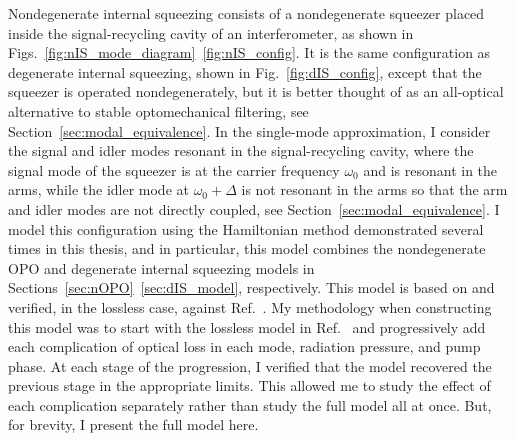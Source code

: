 Nondegenerate internal squeezing consists of a nondegenerate squeezer placed inside the signal-recycling cavity of an interferometer, as shown in Figs.~\ref{fig:nIS_mode_diagram}~\ref{fig:nIS_config}. It is the same configuration as degenerate internal squeezing, shown in Fig.~\ref{fig:dIS_config}, except that the squeezer is operated nondegenerately, but it is better thought of as an all-optical alternative to stable optomechanical filtering, see Section~\ref{sec:modal_equivalence}. In the single-mode approximation, I consider the signal and idler modes resonant in the signal-recycling cavity, where the signal mode of the squeezer is at the carrier frequency $\omega_0$ and is resonant in the arms, while the idler mode at $\omega_0+\Delta$ is not resonant in the arms so that the arm and idler modes are not directly coupled, see Section~\ref{sec:modal_equivalence}. 
I model this configuration using the Hamiltonian method demonstrated several times in this thesis, and in particular, this model combines the nondegenerate OPO and degenerate internal squeezing models in Sections~\ref{sec:nOPO}~\ref{sec:dIS_model}, respectively. %
This model is based on and verified, in the lossless case, against Ref.~\cite{Li2020}. 
My methodology when constructing this model was to start with the lossless model in Ref.~\cite{Li2020} and progressively add each complication of optical loss in each mode, radiation pressure, and pump phase. At each stage of the progression, I verified that the model recovered the previous stage in the appropriate limits. This allowed me to study the effect of each complication separately rather than study the full model all at once.  But, for brevity, I present the full model here.

